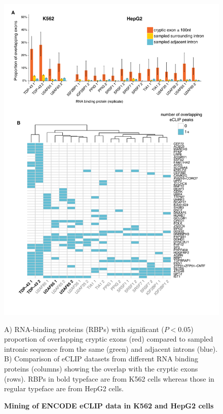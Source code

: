 \begin{figure}[h!]
	\centering
	\includegraphics[width=\textwidth]{Figures/03_cryptic_exons/Figure_7_ENCODE_mining.png}
	\caption{\textbf{Mining of ENCODE eCLIP data in K562 and HepG2 cells}}
	A) RNA-binding proteins (RBPs) with significant ($P < 0.05$) proportion of overlapping cryptic exons (red) compared to sampled intronic sequence from the same (green) and adjacent introns (blue). B) Comparison of eCLIP datasets from different RNA binding proteins (columns) showing the overlap with the cryptic exons (rows). RBPs in bold typeface are from K562 cells whereas those in regular typeface are from HepG2 cells.
	\label{fig:cryptic_mining}
\end{figure}

